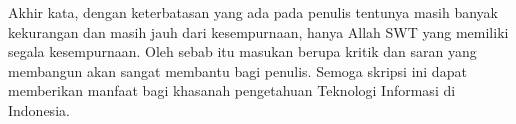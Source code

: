 Akhir kata, dengan keterbatasan yang ada pada penulis tentunya masih banyak kekurangan dan masih jauh dari kesempurnaan, hanya Allah SWT yang memiliki segala kesempurnaan. Oleh sebab itu masukan berupa kritik dan saran yang membangun akan sangat membantu bagi penulis. Semoga skripsi ini dapat memberikan manfaat bagi khasanah pengetahuan Teknologi Informasi di Indonesia.

